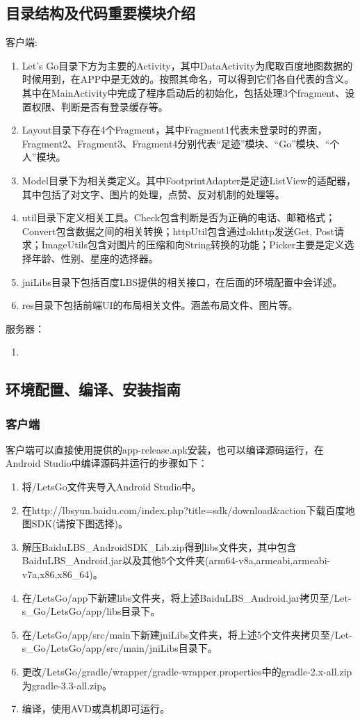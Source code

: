 \documentclass[UTF8]{article}
\begin{document}
\subsection{目录结构及代码重要模块介绍}
客户端:
\begin{enumerate}
    \item Let's Go目录下方为主要的Activity，其中DataActivity为爬取百度地图数据的时候用到，在APP中是无效的。按照其命名，可以得到它们各自代表的含义。其中在MainActivity中完成了程序启动后的初始化，包括处理3个fragment、设置权限、判断是否有登录缓存等。
    \item Layout目录下存在4个Fragment，其中Fragment1代表未登录时的界面，Fragment2、Fragment3、Fragment4分别代表“足迹”模块、“Go”模块、“个人”模块。
    \item Model目录下为相关类定义。其中FootprintAdapter是足迹ListView的适配器，其中包括了对文字、图片的处理，点赞、反对机制的处理等。
    \item util目录下定义相关工具。Check包含判断是否为正确的电话、邮箱格式；Convert包含数据之间的相关转换；httpUtil包含通过okhttp发送Get, Post请求；ImageUtils包含对图片的压缩和向String转换的功能；Picker主要是定义选择年龄、性别、星座的选择器。
    \item jniLibs目录下包括百度LBS提供的相关接口，在后面的环境配置中会详述。
    \item res目录下包括前端UI的布局相关文件。涵盖布局文件、图片等。
\end{enumerate}

服务器：
\begin{enumerate}
    \item
\end{enumerate}

\subsection{环境配置、编译、安装指南}
\subsubsection{客户端}
客户端可以直接使用提供的app-release.apk安装，也可以编译源码运行，在Android Studio中编译源码并运行的步骤如下：
\begin{enumerate}
    \item 将/LetsGo文件夹导入Android Studio中。
    \item 在http://lbsyun.baidu.com/index.php?title=sdk/download&action下载百度地图SDK(请按下图选择)。
    \item 解压BaiduLBS_AndroidSDK_Lib.zip得到libs文件夹，其中包含BaiduLBS_Android.jar以及其他5个文件夹(arm64-v8a,armeabi,armeabi-v7a,x86,x86_64)。
    \item 在/LetsGo/app下新建libs文件夹，将上述BaiduLBS_Android.jar拷贝至/Let-s_Go/LetsGo/app/libs目录下。
    \item 在/LetsGo/app/src/main下新建jniLibs文件夹，将上述5个文件夹拷贝至/Let-s_Go/LetsGo/app/src/main/jniLibs目录下。
    \item 更改/LetsGo/gradle/wrapper/gradle-wrapper.properties中的gradle-2.x-all.zip为gradle-3.3-all.zip。
    \item 编译，使用AVD或真机即可运行。
\end{enumerate}
\end{document}
